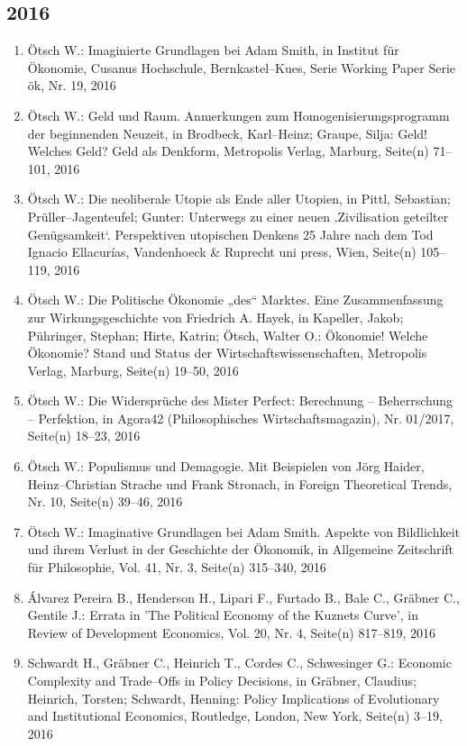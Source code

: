 \subsection*{2016}
\begin{enumerate}
    	 \item Ötsch W.: Imaginierte Grundlagen bei Adam Smith, in Institut für Ökonomie, Cusanus Hochschule, Bernkastel--Kues, Serie Working Paper Serie ök, Nr. 19, 2016
	 \item Ötsch W.: Geld und Raum. Anmerkungen zum Homogenisierungsprogramm der beginnenden Neuzeit, in Brodbeck, Karl--Heinz; Graupe, Silja: Geld! Welches Geld? Geld als Denkform, Metropolis Verlag, Marburg, Seite(n) 71--101, 2016
	 \item Ötsch W.: Die neoliberale Utopie als Ende aller Utopien, in Pittl, Sebastian; Prüller--Jagenteufel; Gunter: Unterwegs zu einer neuen ‚Zivilisation geteilter Genügsamkeit‘. Perspektiven utopischen Denkens 25 Jahre nach dem Tod Ignacio Ellacurías, Vandenhoeck \& Ruprecht uni press, Wien, Seite(n) 105--119, 2016
	 \item Ötsch W.: Die Politische Ökonomie „des“ Marktes. Eine Zusammenfassung zur Wirkungsgeschichte von Friedrich A. Hayek, in Kapeller, Jakob; Pühringer, Stephan; Hirte, Katrin; Ötsch, Walter O.: Ökonomie! Welche Ökonomie? Stand und Status der Wirtschaftswissenschaften, Metropolis Verlag, Marburg, Seite(n) 19--50, 2016
	 \item Ötsch W.: Die Widersprüche des Mister Perfect: Berechnung – Beherrschung – Perfektion, in Agora42 (Philosophisches Wirtschaftsmagazin), Nr. 01/2017, Seite(n) 18--23, 2016
	 \item Ötsch W.: Populismus und Demagogie. Mit Beispielen von Jörg Haider, Heinz–Christian Strache und Frank Stronach, in Foreign Theoretical Trends, Nr. 10, Seite(n) 39--46, 2016
	 \item Ötsch W.: Imaginative Grundlagen bei Adam Smith. Aspekte von Bildlichkeit und ihrem Verlust in der Geschichte der Ökonomik, in Allgemeine Zeitschrift für Philosophie, Vol. 41, Nr. 3, Seite(n) 315--340, 2016
	 \item Álvarez Pereira B., Henderson H., Lipari F., Furtado B., Bale C., Gräbner C., Gentile J.: Errata in 'The Political Economy of the Kuznets Curve', in Review of Development Economics, Vol. 20, Nr. 4, Seite(n) 817--819, 2016
	 \item Schwardt H., Gräbner C., Heinrich T., Cordes C., Schwesinger G.: Economic Complexity and Trade--Offs in Policy Decisions, in Gräbner, Claudius; Heinrich, Torsten; Schwardt, Henning: Policy Implications of Evolutionary and Institutional Economics, Routledge, London, New York, Seite(n) 3--19, 2016

\end{enumerate}
